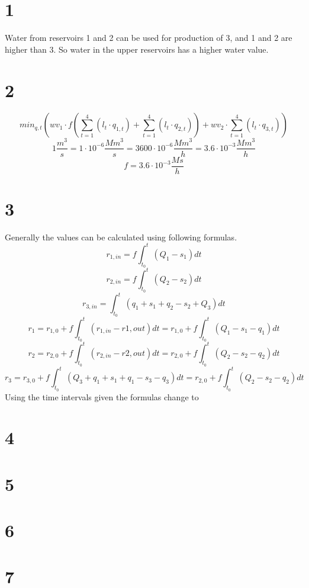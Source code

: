 \documentclass{article}
\begin{document}
\section{1}
Water from reservoirs 1 and 2 can be used for production of 3, and 1 and 2 are higher than 3. So water in the upper reservoirs has a higher water value.
\section{2}
\begin{equation}
min_{q,t}(wv_1\cdot f(\sum_{t=1}^4(l_t\cdot q_{1,t})+\sum_{t=1}^4(l_t\cdot q_{2,t}))+wv_2\cdot \sum_{t=1}^4(l_t\cdot q_{3,t}))
\end{equation}
\begin{equation}
1\frac{m^3}{s}=1\cdot 10^{-6}\frac{Mm^3}{s}=3600\cdot 10^{-6}\frac{Mm^3}{h}=3.6\cdot 10^{-3}\frac{Mm^3}{h}
\end{equation}
\begin{equation}
f=3.6\cdot 10^{-3}\frac{Ms}{h}
\end{equation}
\section{3}
Generally the values can be calculated using following formulas.
\begin{equation}
r_{1,in}=f\int_{t_0}^{t}(Q_1-s_1)dt
\end{equation}
\begin{equation}
r_{2,in}=f\int_{t_0}^{t}(Q_2-s_2)dt
\end{equation}
\begin{equation}
r_{3,in}=\int_{t_0}^{t}(q_1+s_1+q_2-s_2+Q_3)dt
\end{equation}
\begin{equation}
r_{1}=r_{1,0}+f\int_{t_0}^{t}(r_{1,in}-r{1,out})dt = r_{1,0}+f\int_{t_0}^{t}(Q_1-s_1-q_1)dt
\end{equation}
\begin{equation}
r_{2}=r_{2,0}+f\int_{t_0}^{t}(r_{2,in}-r{2,out})dt = r_{2,0}+f\int_{t_0}^{t}(Q_2-s_2-q_2)dt
\end{equation}
\begin{equation}
r_{3}=r_{3,0}+f\int_{t_0}^{t}(Q_3+q_1+s_1+q_1-s_3-q_3)dt = r_{2,0}+f\int_{t_0}^{t}(Q_2-s_2-q_2)dt
\end{equation}
Using the time intervals given the formulas change to

\section{4}

\section{5}

\section{6}

\section{7}
\end{document}
